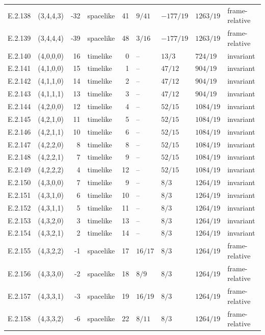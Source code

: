 {\begin{longtable}{@{}llrlrllll@{}}
E.2.138 & (3,4,4,3) & -32 & spacelike & 41 & $9/41$ & $-177/19$ & $1263/19$ & frame-relative \\
E.2.139 & (3,4,4,4) & -39 & spacelike & 48 & $3/16$ & $-177/19$ & $1263/19$ & frame-relative \\
E.2.140 & (4,0,0,0) & 16 & timelike & 0 & -- & $13/3$ & $724/19$ & invariant \\
E.2.141 & (4,1,0,0) & 15 & timelike & 1 & -- & $47/12$ & $904/19$ & invariant \\
E.2.142 & (4,1,1,0) & 14 & timelike & 2 & -- & $47/12$ & $904/19$ & invariant \\
E.2.143 & (4,1,1,1) & 13 & timelike & 3 & -- & $47/12$ & $904/19$ & invariant \\
E.2.144 & (4,2,0,0) & 12 & timelike & 4 & -- & $52/15$ & $1084/19$ & invariant \\
E.2.145 & (4,2,1,0) & 11 & timelike & 5 & -- & $52/15$ & $1084/19$ & invariant \\
E.2.146 & (4,2,1,1) & 10 & timelike & 6 & -- & $52/15$ & $1084/19$ & invariant \\
E.2.147 & (4,2,2,0) & 8 & timelike & 8 & -- & $52/15$ & $1084/19$ & invariant \\
E.2.148 & (4,2,2,1) & 7 & timelike & 9 & -- & $52/15$ & $1084/19$ & invariant \\
E.2.149 & (4,2,2,2) & 4 & timelike & 12 & -- & $52/15$ & $1084/19$ & invariant \\
E.2.150 & (4,3,0,0) & 7 & timelike & 9 & -- & $8/3$ & $1264/19$ & invariant \\
E.2.151 & (4,3,1,0) & 6 & timelike & 10 & -- & $8/3$ & $1264/19$ & invariant \\
E.2.152 & (4,3,1,1) & 5 & timelike & 11 & -- & $8/3$ & $1264/19$ & invariant \\
E.2.153 & (4,3,2,0) & 3 & timelike & 13 & -- & $8/3$ & $1264/19$ & invariant \\
E.2.154 & (4,3,2,1) & 2 & timelike & 14 & -- & $8/3$ & $1264/19$ & invariant \\
E.2.155 & (4,3,2,2) & -1 & spacelike & 17 & $16/17$ & $8/3$ & $1264/19$ & frame-relative \\
E.2.156 & (4,3,3,0) & -2 & spacelike & 18 & $8/9$ & $8/3$ & $1264/19$ & frame-relative \\
E.2.157 & (4,3,3,1) & -3 & spacelike & 19 & $16/19$ & $8/3$ & $1264/19$ & frame-relative \\
E.2.158 & (4,3,3,2) & -6 & spacelike & 22 & $8/11$ & $8/3$ & $1264/19$ & frame-relative \\

\end{longtable}}
